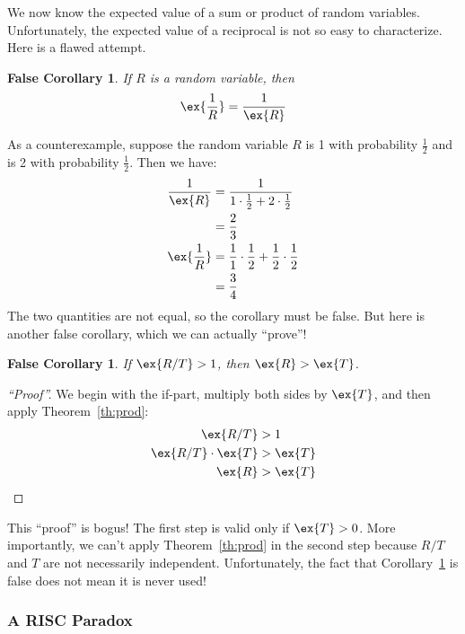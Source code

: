 \documentclass[12pt,twoside]{article}
\newtheorem{false_corollary}[theorem]{False Corollary}
\newenvironment{qproof}
{\begin{proof}[``Proof'']}
{\end{proof}}
\begin{document}
We now know the expected value of a sum or product of random
variables.  Unfortunately, the expected value of a reciprocal is not
so easy to characterize.  Here is a flawed attempt.

\begin{false_corollary}
If $R$ is a random variable, then
%
\[
\ex{\frac{1}{R}} = \frac{1}{\ex{R}}
\]
\end{false_corollary}

As a counterexample, suppose the random variable $R$ is 1 with
probability $\frac{1}{2}$ and is 2 with probability $\frac{1}{2}$.
Then we have:
%
\begin{align*}
\frac{1}{\ex{R}}
    & = \frac{1}{1 \cdot \frac{1}{2} + 2 \cdot \frac{1}{2}} \\
    & = \frac{2}{3} \\
\ex{\frac{1}{R}}
    & = \frac{1}{1} \cdot \frac{1}{2} + \frac{1}{2} \cdot \frac{1}{2} \\
    & = \frac{3}{4}
\end{align*}
%
The two quantities are not equal, so the corollary must be false.  But
here is another false corollary, which we can actually ``prove''!

\begin{false_corollary}
\label{cor:false}
If $\ex{R/T} > 1$, then $\ex{R} > \ex{T}$.
\end{false_corollary}

\begin{qproof}
We begin with the if-part, multiply both sides by $\ex{T}$, and then
apply Theorem~\ref{th:prod}:
%
\begin{align*}
\ex{R/T} & > 1 \\
\ex{R/T} \cdot \ex{T} & > \ex{T} \\
\ex{R} & > \ex{T}
\end{align*}
\end{qproof}

This ``proof'' is bogus!  The first step is valid only if $\ex{T} > 0$.
More importantly, we can't apply Theorem~\ref{th:prod} in the second step
because $R/T$ and $T$ are not necessarily independent.  Unfortunately, the
fact that Corollary~\ref{cor:false} is false does not mean it is never
used!

\subsubsection{A RISC Paradox}
\end{document}
